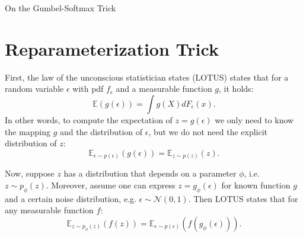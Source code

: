\documentclass[11pt]{article}
\def\E{\mathbb{E}}
\def\eps{\epsilon}
\begin{document}
\begin{center}
{\LARGE On the Gumbel-Softmax Trick} 
\end{center}

\begin{abstract}
The reparameterization trick enables optimizing networks with stochastic units via gradient descent \cite{KingmaW13}. The essence of the trick is to re-factor each stochastic unit into a differentiable function of its parameters and a random variable with fixed distribution. After refactoring, the gradients of the loss propagated by the chain rule are low variance unbiased estimators of the gradients of the expected loss. While many continuous random variables have such re-parameterizations, discrete random variables lack useful reparameterizations due to the discontinuous nature of discrete states. As a remedy, the gumbel soft-max trick \cite{jang2016categorical} or concrete distribution \cite{MaddisonMT16} serves as a continuous relaxation of discrete random variables. See \cite{KingmaW13}, \cite{MaddisonMT16}, \cite{jang2016categorical}, \cite{casmls2017}, \cite{jang2016}.
\end{abstract}

\section{Reparameterization Trick}

First, the law of the unconscious statistician states (LOTUS) states that for a random variable $\eps$ with pdf $f_\eps$ and a measurable function $g$, it holds:
\begin{equation}
\E(g(\eps)) = \int g(X) d F_\eps(x).
\end{equation}
In other words, to compute the expectation of $z = g(\eps)$ we only need to know the mapping $g$ and the distribution of $\epsilon$, but we do not need the explicit distribution of $z$:
\begin{equation}
\E_{\eps\sim p(\eps)}(g(\eps)) = \E_{z\sim p(z)}(z).
\end{equation}

Now, suppose $z$ has a distribution that depends on a parameter $\phi$, i.e. $z\sim p_\phi (z)$. Moreover, assume one can express $z = g_\phi(\eps)$ for known function $g$ and a certain noise distribution, e.g. $\eps\sim\mathcal{N}(0,1)$. Then LOTUS states that for any measurable function $f$:
\begin{equation}
\E_{z\sim p_\phi (z)}(f(z)) = \E_{\eps\sim p(\eps)}(f(g_\phi(\eps))).
\end{equation}
\end{document}
